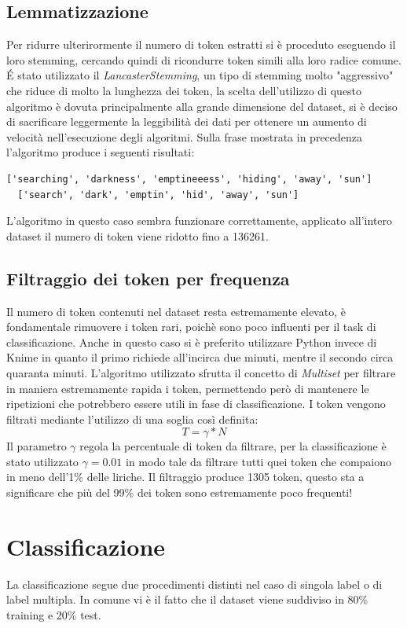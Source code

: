 \documentclass[technote]{IEEEtran}
\begin{document}
\subsection{Lemmatizzazione}
Per ridurre ulterirormente il numero di token estratti si è proceduto eseguendo il loro stemming, cercando quindi di ricondurre token simili alla loro radice comune. \'E stato utilizzato il \textit{LancasterStemming}, un tipo di stemming molto "aggressivo" che riduce di molto la lunghezza dei token, la scelta dell'utilizzo di questo algoritmo è dovuta principalmente alla grande dimensione del dataset, si è deciso di sacrificare leggermente la leggibilità dei dati per ottenere un aumento di velocità nell'esecuzione degli algoritmi. Sulla frase mostrata in precedenza l'algoritmo produce i seguenti risultati:
\begin{lstlisting}[basicstyle=\tiny]
  ['searching', 'darkness', 'emptineeess', 'hiding', 'away', 'sun']
  ['search', 'dark', 'emptin', 'hid', 'away', 'sun']
\end{lstlisting}
L'algoritmo in questo caso sembra funzionare correttamente, applicato all'intero dataset il numero di token viene ridotto fino a 136261.
\subsection{Filtraggio dei token per frequenza}
Il numero di token contenuti nel dataset resta estremamente elevato, è fondamentale rimuovere i token rari, poichè sono poco influenti per il task di classificazione.
Anche in questo caso si è preferito utilizzare Python invece di Knime in quanto il primo richiede all'incirca due minuti, mentre il secondo circa quaranta minuti. L'algoritmo utilizzato sfrutta il concetto di \textit{Multiset} per filtrare in maniera estremamente rapida i token, permettendo però di mantenere le ripetizioni che potrebbero essere utili in fase di classificazione.
I token vengono filtrati mediante l'utilizzo di una soglia così definita:
\begin{equation}
T = \gamma * N 
\end{equation}
Il parametro $ \gamma $ regola la percentuale di token da filtrare, per la classificazione è stato utilizzato $ \gamma = 0.01 $ in modo tale da filtrare tutti quei token che compaiono in meno dell'1\% delle liriche.
Il filtraggio produce 1305 token, questo sta a significare che più del 99\% dei token sono estremamente poco frequenti!
\section{Classificazione}
La classificazione segue due procedimenti distinti nel caso di singola label o di label multipla. In comune vi è il fatto che il dataset viene suddiviso in 80\% training e 20\% test.
\end{document}
